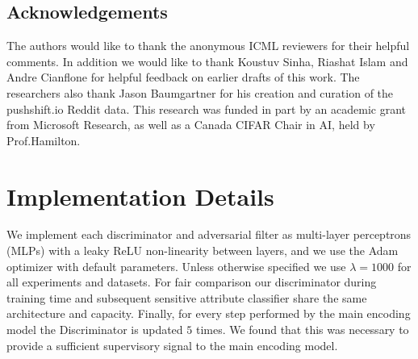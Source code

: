 \documentclass{article}
\begin{document}
\printAffiliationsAndNotice{}  %
\begin{abstract}
 Learning high-quality node embeddings is an important building block for machine learning models that operate on graph data, such as social networks and recommender systems. However, existing graph embedding techniques are unable to cope with fairness constraints, e.g., ensuring that the learned representations do not correlate with certain attributes, such as age or gender. Here, we introduce an adversarial framework to enforce fairness constraints on graph embeddings. Our approach is {\em compositional}---meaning that it can flexibly accommodate different combinations of fairness constraints during inference. 
 For instance, in the context of social recommendations, our framework would allow one user to request that their recommendations are invariant to both their age and gender, while also allowing another user to request invariance to just their age. 
 Experiments on standard knowledge graph and recommender system benchmarks highlight the utility of our proposed framework. 
\end{abstract}






\subsection*{Acknowledgements}
The authors would like to thank the anonymous ICML reviewers for their helpful comments. In addition we would like to thank Koustuv Sinha, Riashat Islam and Andre Cianflone for helpful feedback on earlier drafts of this work.
The researchers also thank Jason Baumgartner for his creation and curation of the pushshift.io Reddit data. 
This research was funded in part by an academic grant from Microsoft Research, as well as a Canada CIFAR Chair in AI, held by Prof.\@ Hamilton.



\clearpage
\appendix
\section{Implementation Details}
We implement each discriminator and adversarial filter as  multi-layer perceptrons (MLPs) with a leaky ReLU non-linearity between layers, and we use the Adam optimizer with default parameters. Unless otherwise specified we use $\lambda=1000$ for all experiments and datasets. For fair comparison our discriminator during training time and subsequent sensitive attribute classifier share the same architecture and capacity. Finally, for every step performed by the main encoding model the Discriminator is updated $5$ times. We found that this was necessary to provide a sufficient supervisory signal to the main encoding model.
\end{document}
